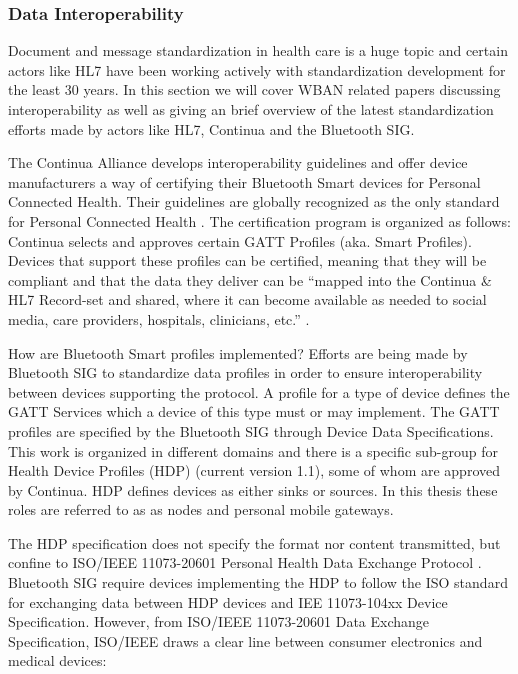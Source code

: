 \subsubsection{Data Interoperability} %
\label{ssub:data_interoperability}


Document and message standardization in health care is a huge topic and certain actors like HL7 have been working actively with standardization development for the least 30 years. In this section we will cover WBAN related papers discussing interoperability as well as giving an brief overview of the latest standardization efforts made by actors like HL7, Continua and the Bluetooth SIG.

The Continua Alliance develops interoperability guidelines and offer device manufacturers a way of certifying their Bluetooth Smart devices for Personal Connected Health. Their guidelines are globally recognized as the only standard for Personal Connected Health \cite{newRef:27}. The certification program is organized as follows: Continua selects and approves certain GATT Profiles (aka. Smart Profiles). Devices that support these profiles can be certified, meaning that they will be compliant and that the data they deliver can be ``mapped into the Continua & HL7 Record-set and shared, where it can become available as needed to social media, care providers, hospitals, clinicians, etc.'' \cite{newRef:27}.

How are Bluetooth Smart profiles implemented? Efforts are being made by Bluetooth SIG to standardize data profiles in order to ensure interoperability between devices supporting the protocol. A profile for a type of device defines the GATT Services which a device of this type must or may implement. The GATT profiles are specified by the Bluetooth SIG through Device Data Specifications. This work is organized in different domains and there is a specific sub-group for Health Device Profiles (HDP) (current version 1.1), some of whom are approved by Continua. HDP defines devices as either sinks or sources. In this thesis these roles are referred to as as nodes and personal mobile gateways.

The HDP specification does not specify the format nor content transmitted, but confine to ISO/IEEE 11073-20601 Personal Health Data Exchange Protocol \cite{newRef:18}. Bluetooth SIG require devices implementing the HDP to follow the ISO standard for exchanging data between HDP devices and IEE 11073-104xx Device Specification. However, from ISO/IEEE 11073-20601 Data Exchange Specification, ISO/IEEE draws a clear line between consumer electronics and medical devices: 


